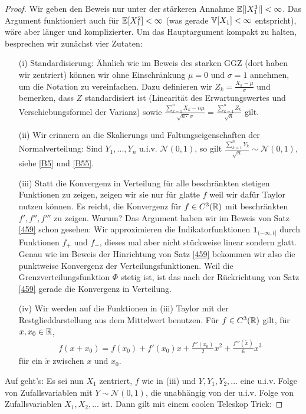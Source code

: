 \begin{proof}
	Wir geben den Beweis nur unter der st\"arkeren Annahme $\mathbb{E}[|X_1^3|]<\infty$. Das Argument funktioniert auch f\"ur $\mathbb{E}[X_1^2]<\infty$ (was gerade $\mathbb{V}[X_1]<\infty$ entspricht), w\"are aber l\"anger und komplizierter. Um das Hauptargument kompakt zu halten, besprechen wir zun\"achst vier Zutaten:
	\begin{itemize}
		\item[(i)] Standardisierung: \"Ahnlich wie im Beweis des starken GGZ (dort haben wir zentriert) k\"onnen wir ohne Einschr\"ankung $\mu=0$ und $\sigma=1$ annehmen, um die Notation zu vereinfachen. Dazu definieren wir $Z_k=\frac{X_k-\mu}{\sigma}$ und bemerken, dass $Z$ standardisiert ist (Linearit\"at des Erwartungswertes und Verschiebungsformel der Varianz) sowie $\frac{\sum_{k=1}^{n}X_k - n \mu}{\sqrt{n \cdot }\sigma} =\frac{\sum_{k=1}^n Z_k}{\sqrt{n}}$ gilt.
		\item[(ii)] Wir erinnern an die Skalierungs und Faltungseigenschaften der Normalverteilung: Sind $Y_1,...,Y_n$ u.i.v. $\mathcal N(0,1)$, so gilt $\frac{\sum_{k=1}^n Y_k}{\sqrt{n}}\sim \mathcal N(0,1)$, siehe \ref{B5} und \ref{B55}.
		\item[(iii)] Statt die Konvergenz in Verteilung f\"ur alle beschr\"ankten stetigen Funktionen zu zeigen, zeigen wir sie nur f\"ur glatte $f$ weil wir daf\"ur Taylor nutzen k\"onnen. Es reicht, die Konvergenz f\"ur $f\in C^3(\mathbb{R})$ mit beschr\"ankten $f', f'', f'''$ zu zeigen. Warum? Das Argument haben wir im Beweis von Satz \ref{459} schon gesehen: Wir approximieren die Indikatorfunktionen $\mathbf 1_{(-\infty,t]}$ durch Funktionen $f_+$ und $f_-$, dieses mal aber nicht st\"uckweise linear sondern glatt. Genau wie im Beweis der Hinrichtung von Satz \ref{459} bekommen wir also die punktweise Konvergenz der Verteilungsfunktionen. Weil die Grenzverteilungsfunktion $\Phi$ stetig ist, ist das nach der R\"uckrichtung von Satz \ref{459} gerade die Konvergenz in Verteilung.		
						\item[(iv)] Wir werden auf die Funktionen in (iii) Taylor mit der Restglieddarstellung aus dem Mittelwert benutzen. F\"ur $f\in C^3(\mathbb{R})$ gilt, f\"ur $x,x_0\in \mathbb{R}$,
		\begin{align*}
			f(x+x_0)=f(x_0)+f'(x_0)x+ \frac{f''(x_0)}{2}x^2+\frac{f'''(\tilde x)}{6} x^3
		\end{align*} 		
		f\"ur ein $\tilde x$ zwischen $x$ und $x_0$.
	\end{itemize}
Auf geht's: Es sei nun $X_1$ zentriert, $f$ wie in (iii) und $Y, Y_1,Y_2,...$ eine u.i.v. Folge von Zufallsvariablen mit $Y \sim \mathcal N(0,1)$, die unabh\"angig von der u.i.v. Folge von Zufallsvariablen $X_1,X_2,...$ ist. Dann gilt mit einem coolen Teleskop Trick:

\end{proof}
